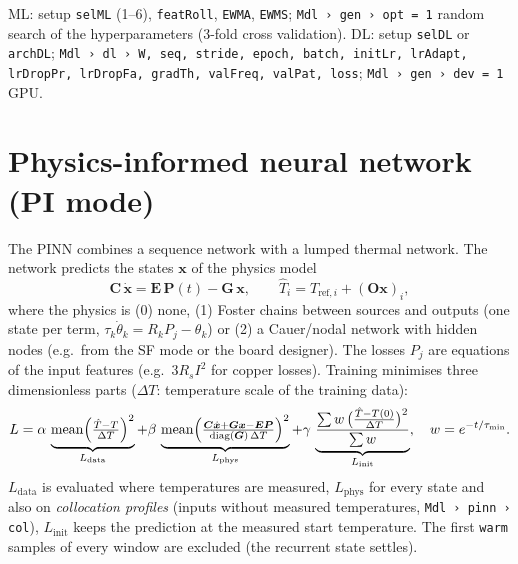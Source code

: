\documentclass[11pt,a4paper]{article}
\newcommand{\mat}[1]{\bm{#1}}
\newcommand{\cfg}[1]{\texttt{#1}}
\begin{document}
\begin{cfgbox}
ML: setup \cfg{selML} (1--6), \cfg{featRoll}, \cfg{EWMA}, \cfg{EWMS}; \cfg{Mdl › gen › opt = 1} random search of the
hyperparameters (3-fold cross validation). DL: setup \cfg{selDL} or \cfg{archDL}; \cfg{Mdl › dl › W, seq, stride,
epoch, batch, initLr, lrAdapt, lrDropPr, lrDropFa, gradTh, valFreq, valPat, loss}; \cfg{Mdl › gen › dev = 1} GPU.
\end{cfgbox}

\section{Physics-informed neural network (PI mode)}\label{sec:pinn}
The PINN \cite{raissi} combines a sequence network with a lumped thermal network. The network predicts the states $\bm x$ of the
physics model
\begin{equation}
  \mat C\,\dot{\bm x} = \mat E\,\bm P(t) - \mat G\,\bm x,\qquad \hat T_i = T_{\mathrm{ref},i} + (\mat O\bm x)_i ,
\end{equation}
where the physics is (0) none, (1) Foster chains between sources and outputs (one state per term,
$\tau_k\dot\theta_k = R_kP_j-\theta_k$) or (2) a Cauer/nodal network with hidden nodes (e.g.\ from the SF mode or the
board designer). The losses $P_j$ are equations of the input features (e.g.\ $3R_sI^2$ for copper losses). Training
minimises three dimensionless parts ($\Delta T$: temperature scale of the training data):
\begin{equation}
  L = \alpha\,\underbrace{\mathrm{mean}\Bigl(\tfrac{\hat T - T}{\Delta T}\Bigr)^2}_{L_{\mathrm{data}}}
    + \beta\,\underbrace{\mathrm{mean}\Bigl(\tfrac{\mat C\dot{\bm x}+\mat G\bm x-\mat E\bm P}{\mathrm{diag}(\mat G)\,\Delta
      T}\Bigr)^2}_{L_{\mathrm{phys}}}
    + \gamma\,\underbrace{\frac{\sum w\,\bigl(\tfrac{\hat T-T(0)}{\Delta T}\bigr)^2}{\sum w}}_{L_{\mathrm{init}}},
    \quad w=e^{-t/\tau_{\min}} .
\end{equation}
$L_{\mathrm{data}}$ is evaluated where temperatures are measured, $L_{\mathrm{phys}}$ for every state and also on
\emph{collocation profiles} (inputs without measured temperatures, \cfg{Mdl › pinn › col}), $L_{\mathrm{init}}$ keeps
the prediction at the measured start temperature. The first \cfg{warm} samples of every window are excluded (the
recurrent state settles).
\end{document}
